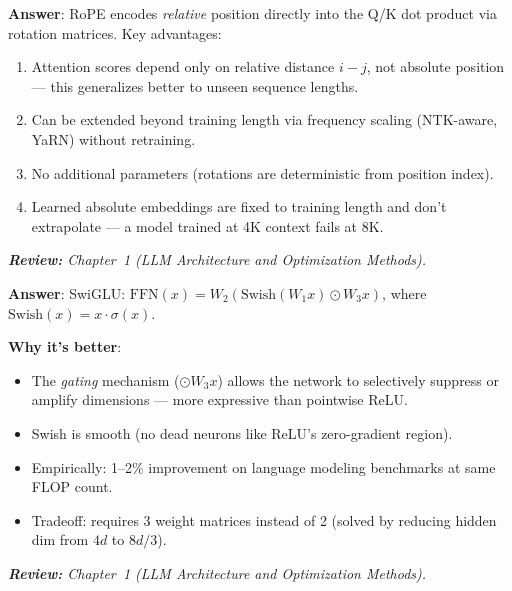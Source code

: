 \begin{questionbox}
\textbf{Answer}: RoPE encodes \emph{relative} position directly into the Q/K dot product via rotation matrices. Key advantages:

\begin{enumerate}
  \item Attention scores depend only on relative distance $i-j$, not absolute position --- this generalizes better to unseen sequence lengths.
  \item Can be extended beyond training length via frequency scaling (NTK-aware, YaRN) without retraining.
  \item No additional parameters (rotations are deterministic from position index).
  \item Learned absolute embeddings are fixed to training length and don’t extrapolate --- a model trained at 4K context fails at 8K.
\end{enumerate}

\emph{\textbf{Review:} Chapter~1 (LLM Architecture and Optimization Methods).}
\end{questionbox}

\begin{questionbox}
\textbf{Answer}: SwiGLU: $\text{FFN}(x) = W_2 (\text{Swish}(W_1 x) \odot W_3 x)$, where $\text{Swish}(x) = x \cdot \sigma(x)$.

\textbf{Why it’s better}:

\begin{itemize}
  \item The \emph{gating} mechanism ($\odot W_3 x$) allows the network to selectively suppress or amplify dimensions --- more expressive than pointwise ReLU.
  \item Swish is smooth (no dead neurons like ReLU’s zero-gradient region).
  \item Empirically: 1--2\% improvement on language modeling benchmarks at same FLOP count.
  \item Tradeoff: requires 3 weight matrices instead of 2 (solved by reducing hidden dim from $4d$ to $8d/3$).
\end{itemize}

\emph{\textbf{Review:} Chapter~1 (LLM Architecture and Optimization Methods).}
\end{questionbox}

